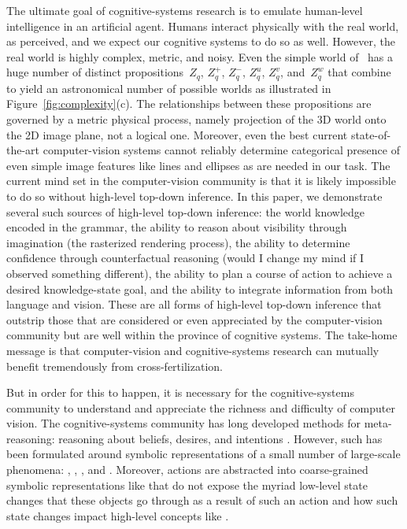 The ultimate goal of cognitive-systems research is to emulate human-level
intelligence in an artificial agent.
%
Humans interact physically with the real world, as perceived, and we expect our
cognitive systems to do so as well.
%
However, the real world is highly complex, metric, and noisy.
%
Even the simple world of \LincolnLogs\ has a huge number of distinct
propositions~$Z_q$, $Z^+_q$, $Z^-_q$, $Z^u_q$, $Z^v_q$, and~$Z^w_q$ that
combine to yield an astronomical number of possible worlds as illustrated in
Figure~\ref{fig:complexity}(c).
%
The relationships between these propositions are governed by a metric physical
process, namely projection of the 3D world onto the 2D image plane, not a
logical one.
%
Moreover, even the best current state-of-the-art computer-vision systems cannot
reliably determine categorical presence of even simple image features like
lines and ellipses as are needed in our task.
%
The current mind set in the computer-vision community is that it is likely
impossible to do so without high-level top-down inference.
%
In this paper, we demonstrate several such sources of high-level top-down
inference: the world knowledge encoded in the grammar, the ability to reason
about visibility through imagination (the rasterized rendering process), the
ability to determine confidence through counterfactual reasoning (would I
change my mind if I observed something different), the ability to plan a course
of action to achieve a desired knowledge-state goal, and the ability to
integrate information from both language and vision.
%
These are all forms of high-level top-down inference that outstrip those that are
considered or even appreciated by the computer-vision community but are well
within the province of cognitive systems.
%
The take-home message is that computer-vision and cognitive-systems research
can mutually benefit tremendously from cross-fertilization.

But in order for this to happen, it is necessary for the cognitive-systems
community to understand and appreciate the richness and difficulty of computer
vision.
%
The cognitive-systems community has long developed methods for meta-reasoning:
reasoning about beliefs, desires, and intentions
\cite{Moore1982,Bratman1988,bratman1990,Cohen1990,Rao1991,hobbs1993}.
%
However, such has been formulated around symbolic representations of a small
number of large-scale phenomena:\!
, ,
, and 
.
%
Moreover, actions are abstracted into coarse-grained symbolic representations
like  that do not expose the myriad low-level state
changes that these objects go through as a result of such an action and how
such state changes impact high-level concepts like
.

